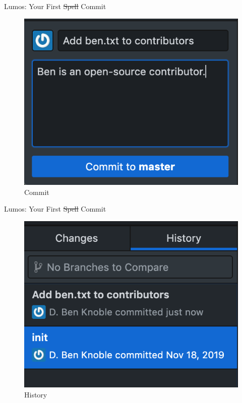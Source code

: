 \documentclass{beamer}
\theoremstyle{example}
\begin{document}
\begin{frame}{Lumos: Your First \sout{Spell} Commit}
    \begin{figure}
        \includegraphics[scale=0.4]{img/commit_ben}
        \caption{Commit}
    \end{figure}
\end{frame}

\begin{frame}{Lumos: Your First \sout{Spell} Commit}
    \begin{figure}
        \includegraphics[scale=0.4]{img/history_ben}
        \caption{History}
    \end{figure}
\end{frame}
\end{document}
